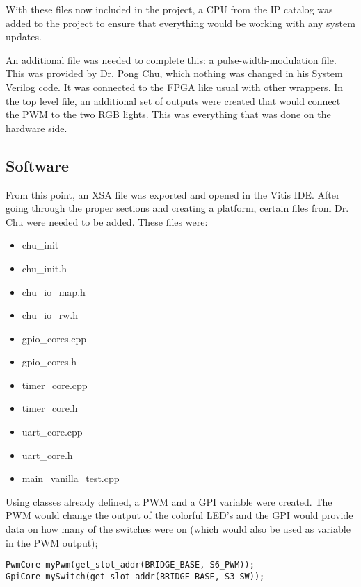 \documentclass[11pt]{article}
\begin{document}
\quad With these files now included in the project, a CPU from the IP catalog was added to the project to ensure that everything would be working with any system updates.

\quad An additional file was needed to complete this: a pulse-width-modulation file. This was  provided by Dr. Pong Chu, which nothing was changed in his System Verilog code. It was connected to the FPGA like usual with other wrappers. In the top level file, an additional set of outputs were created that would connect the PWM to the two RGB lights. This was everything that was done on the hardware side. \\

\subsection{Software}
\quad From this point, an XSA file was exported and opened in the Vitis IDE. After going through the proper sections and creating a platform, certain files from Dr. Chu were needed to be added. These files were: 

\begin{multicols}{2}
	\begin{itemize}
		\item chu\_init
		\item chu\_init.h
		\item chu\_io\_map.h
		\item chu\_io\_rw.h
		\item gpio\_cores.cpp
		\item gpio\_cores.h
		\item timer\_core.cpp
		\item timer\_core.h
		\item uart\_core.cpp
		\item uart\_core.h
		\item main\_vanilla\_test.cpp		
	\end{itemize}
\end{multicols}

\quad Using classes already defined, a PWM and a GPI variable were created. The PWM would change the output of the colorful LED's and the GPI would provide data on how many of the switches were on (which would also be used as variable in the PWM output); 

\begin{lstlisting}[style=CStyle, caption = Core instantiations]
PwmCore myPwm(get_slot_addr(BRIDGE_BASE, S6_PWM));
GpiCore mySwitch(get_slot_addr(BRIDGE_BASE, S3_SW));
\end{lstlisting}
\end{document}
